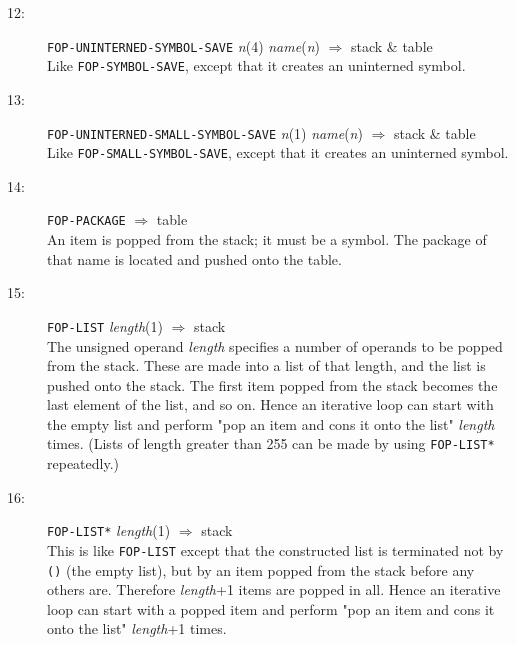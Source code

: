 \begin{description}
\item[12:] \hspace{2em} {\tt FOP-UNINTERNED-SYMBOL-SAVE} \hspace{2em} {\it n}(4) \hspace{2em} {\it name}({\it n})
\hspace{2em} $\Rightarrow$ \hspace{2em} stack \& table\\
Like {\tt FOP-SYMBOL-SAVE}, except that it creates an uninterned symbol.

\item[13:] \hspace{2em} {\tt FOP-UNINTERNED-SMALL-SYMBOL-SAVE} \hspace{2em} {\it n}(1)
\hspace{2em} {\it name}({\it n}) \hspace{2em} $\Rightarrow$ \hspace{2em} stack
\& table\\
Like {\tt FOP-SMALL-SYMBOL-SAVE}, except that it creates an uninterned symbol.

\item[14:] \hspace{2em} {\tt FOP-PACKAGE} \hspace{2em} $\Rightarrow$ \hspace{2em} table \\
An item is popped from the stack; it must be a symbol.	The package of
that name is located and pushed onto the table.

\item[15:] \hspace{2em} {\tt FOP-LIST} \hspace{2em} {\it length}(1) \hspace{2em} $\Rightarrow$ \hspace{2em} stack \\
The unsigned operand {\it length} specifies a number of
operands to be popped from the stack.  These are made into a list
of that length, and the list is pushed onto the stack.
The first item popped from the stack becomes the last element of
the list, and so on.  Hence an iterative loop can start with
the empty list and perform "pop an item and cons it onto the list"
{\it length} times.
(Lists of length greater than 255 can be made by using {\tt FOP-LIST*}
repeatedly.)

\item[16:] \hspace{2em} {\tt FOP-LIST*} \hspace{2em} {\it length}(1) \hspace{2em} $\Rightarrow$ \hspace{2em} stack \\
This is like {\tt FOP-LIST} except that the constructed list is terminated
not by {\tt ()} (the empty list), but by an item popped from the stack
before any others are.	Therefore {\it length}+1 items are popped in all.
Hence an iterative loop can start with
a popped item and perform "pop an item and cons it onto the list"
{\it length}+1 times.


\end{description}
